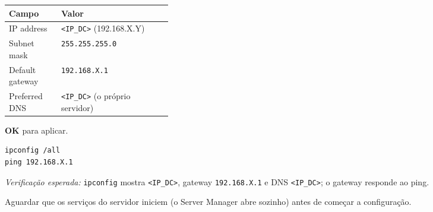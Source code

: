 \begin{center}\small
\begin{tabularx}{\linewidth}{|>{\raggedright\arraybackslash}p{0.32\linewidth}|>{\raggedright\arraybackslash}X|}
\hline
\rowcolor{azul!10}\textbf{Campo} & \textbf{Valor} \\
\hline
IP address & \texttt{\textless{}IP\_DC\textgreater{}} (192.168.X.Y) \\
\hline
Subnet mask & \texttt{255.255.255.0} \\
\hline
Default gateway & \texttt{192.168.X.1} \\
\hline
Preferred DNS & \texttt{\textless{}IP\_DC\textgreater{}} (o próprio servidor) \\
\hline
\end{tabularx}
\end{center}

\textbf{OK} para aplicar.

\begin{lstlisting}[style=psstyle]
ipconfig /all
ping 192.168.X.1
\end{lstlisting}

\emph{Verificação esperada:} \texttt{ipconfig} mostra \texttt{\textless{}IP\_DC\textgreater{}}, gateway \texttt{192.168.X.1} e DNS \texttt{\textless{}IP\_DC\textgreater{}}; o gateway responde ao ping.


Aguardar que os serviços do servidor iniciem (o Server Manager abre sozinho) antes de começar a configuração.


